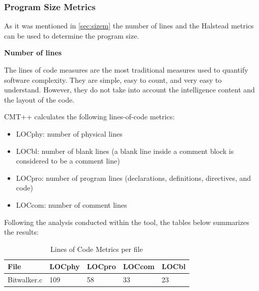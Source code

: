 \subsubsection{Program Size Metrics}
As it was mentioned in \ref{sec:sizem} the number of lines and the Halstead metrics can be used to determine the program size.
\begin{description}
\item \textbf{Number of lines}

The lines of code measures are the most traditional measures used to quantify software complexity. They are simple, easy to count, and very easy to understand. However, they do not take into account the intelligence content and the layout of the code.

CMT++ calculates the following lines-of-code metrics:
\begin{itemize}
\item LOCphy: number of physical lines
\item LOCbl: number of blank lines (a blank line inside a comment block is considered to be a comment line)
\item LOCpro: number of program lines (declarations, definitions, directives, and code)
\item LOCcom: number of comment lines
\end{itemize}

Following the analysis conducted within the tool, the tables below summarizes the results:

\begin{longtable}{||p{}|p{}|p{}|p{}|p{}||}
  \caption{Lines of Code Metrics per file}\\
    \hline\hline
    \textbf{File} &\textbf{LOCphy} & \textbf{LOCpro} & \textbf{LOCcom} & \textbf{LOCbl}\\
    \hline\hline
    \endhead
    \hline\hline
    \endfoot
    Bitwalker.c & 109 & 58 & 33 & 23
    \\
    \hline
   \end{longtable}
   

\end{description}
